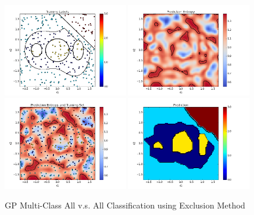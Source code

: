 				\begin{figure}[!htbp]
					\centering
						\includegraphics[width=0.48\textwidth]{Figures/Progress/exclusionAVA/Figure1.png}
						\includegraphics[width=0.48\textwidth]{Figures/Progress/exclusionAVA/Figure2.png}
						\includegraphics[width=0.48\textwidth]{Figures/Progress/exclusionAVA/Figure3.png}
						\includegraphics[width=0.48\textwidth]{Figures/Progress/exclusionAVA/Figure4.png}
					\caption{GP Multi-Class All v.s. All Classification using Exclusion Method}
					\label{ProgressReport:GaussianProcessModels:Figure:exclusionAVA1}
				\end{figure}

